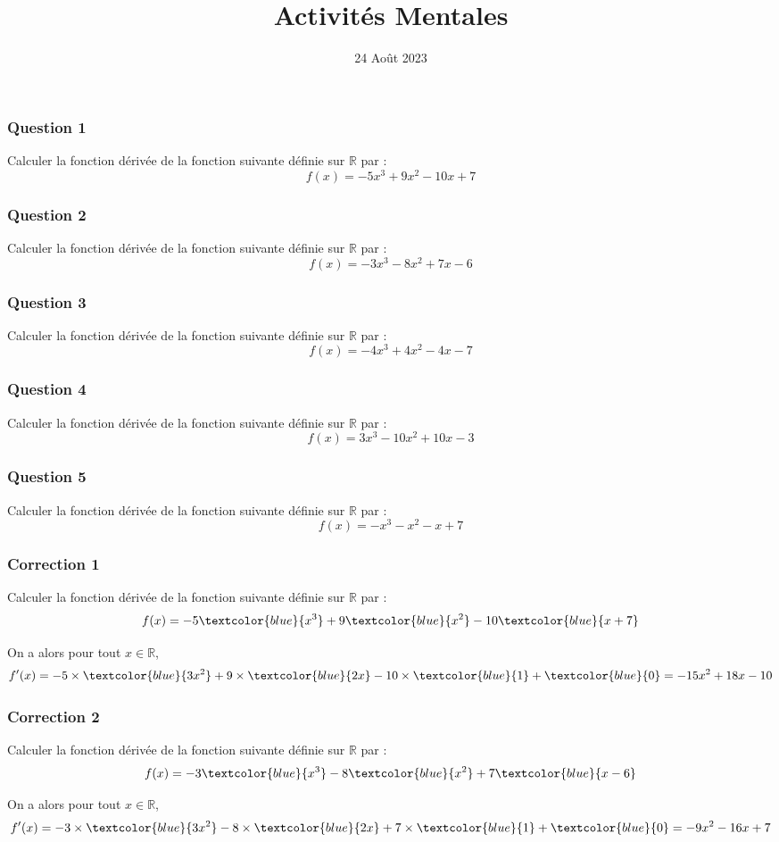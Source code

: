 \documentclass[15pt, mathserif]{beamer}
\title{Activités Mentales}
\date{24 Août 2023}
\newcommand{\R}{\mathbb{R}}			%
\begin{document}
\begin{frame}
    \titlepage
\end{frame}

\begin{frame} 
	\frametitle{Question 1}
Calculer la fonction dérivée de la fonction suivante définie sur $\R$ par : $$f(x)=-5x^3+9x^2-10x+7$$\end{frame}


\begin{frame} 
	\frametitle{Question 2}
Calculer la fonction dérivée de la fonction suivante définie sur $\R$ par : $$f(x)=-3x^3-8x^2+7x-6$$\end{frame}


\begin{frame} 
	\frametitle{Question 3}
Calculer la fonction dérivée de la fonction suivante définie sur $\R$ par : $$f(x)=-4x^3+4x^2-4x-7$$\end{frame}


\begin{frame} 
	\frametitle{Question 4}
Calculer la fonction dérivée de la fonction suivante définie sur $\R$ par : $$f(x)=3x^3-10x^2+10x-3$$\end{frame}


\begin{frame} 
	\frametitle{Question 5}
Calculer la fonction dérivée de la fonction suivante définie sur $\R$ par : $$f(x)=-x^3-x^2-x+7$$\end{frame}


\begin{frame}
\vspace{-10mm}
	\frametitle{Correction 1}
Calculer la fonction dérivée de la fonction suivante définie sur $\R$ par : $$f(x)=-5\textcolor{blue}{x^3}+9\textcolor{blue}{x^2}-10\textcolor{blue}{x+7}$$
 
 On a alors pour tout $x \in  \R$, $$f'(x)= -5\times \textcolor{blue}{3x^2} +9\times \textcolor{blue}{2x}-10\times \textcolor{blue}{1}+\textcolor{blue}{0}=-15x^2+18x-10$$\end{frame}


\begin{frame}
\vspace{-10mm}
	\frametitle{Correction 2}
Calculer la fonction dérivée de la fonction suivante définie sur $\R$ par : $$f(x)=-3\textcolor{blue}{x^3}-8\textcolor{blue}{x^2}+7\textcolor{blue}{x-6}$$
 
 On a alors pour tout $x \in  \R$, $$f'(x)= -3\times \textcolor{blue}{3x^2} -8\times \textcolor{blue}{2x}+7\times \textcolor{blue}{1}+\textcolor{blue}{0}=-9x^2-16x+7$$\end{frame}
\end{document}
